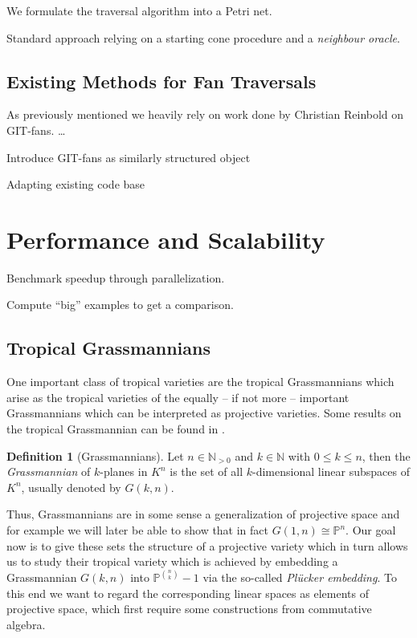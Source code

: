 \documentclass[
  paper=a4,
  DIV=14,
  fontsize=12pt,
  titlepage,
  bibliography=totoc,
  listof=totoc,
  pagesize=pdftex
]{scrartcl}
\numberwithin{figure}{section}
\numberwithin{equation}{section}
\numberwithin{table}{section}
\newcommand*\setN{\mathds{N}}
\newcommand*\setP{\mathds{P}}
\theoremstyle{definition}
\newtheorem{definition}{Definition}
\numberwithin{definition}{section}
\begin{document}
We formulate the traversal algorithm into a Petri net.

Standard approach relying on a starting cone procedure and a \emph{neighbour oracle}.

\subsection{Existing Methods for Fan Traversals}

As previously mentioned we heavily rely on work done by Christian Reinbold on GIT-fans.
\dots

Introduce GIT-fans as similarly structured object

Adapting existing code base

\section{Performance and Scalability}

Benchmark speedup through parallelization.

Compute \enquote{big} examples to get a comparison.

\subsection{Tropical Grassmannians}

One important class of tropical varieties are the tropical Grassmannians which arise as
the tropical varieties of the equally -- if not more -- important Grassmannians which can
be interpreted as projective varieties. Some results on the tropical Grassmannian can be
found in \cite{tropGrass}.

\begin{definition}[Grassmannians]
  Let $n \in \setN_{>0}$ and $k \in \setN$ with $0 \leq k \leq n$, then the
  \emph{Grassmannian} of $k$-planes in $K^n$ is the set of all $k$-dimensional linear
  subspaces of $K^n$, usually denoted by $G(k, n)$.
\end{definition}

Thus, Grassmannians are in some sense a generalization of projective space and for example
we will later be able to show that in fact $G(1,n) \cong \setP^n$. Our goal now is to
give these sets the structure of a projective variety which in turn allows us to study their
tropical variety which is achieved by embedding a Grassmannian $G(k, n)$ into $\setP^{\binom
nk}-1$ via the so-called \emph{Plücker embedding}. To this end we want to regard the
corresponding linear spaces as elements of projective space, which first require some
constructions from commutative algebra.
\end{document}

